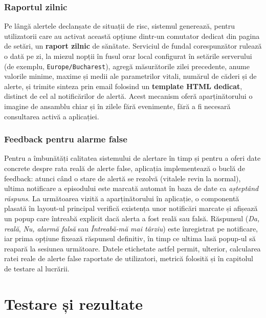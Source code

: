 \documentclass[12pt,a4paper]{article}
\begin{document}
\subsubsection{Raportul zilnic}

Pe lângă alertele declanșate de situații de risc, sistemul generează, pentru utilizatorii care au activat această opțiune dintr-un comutator dedicat din pagina de setări, un \textbf{raport zilnic} de sănătate. Serviciul de fundal corespunzător rulează o dată pe zi, la miezul nopții în fusul orar local configurat în setările serverului (de exemplu, \texttt{Europe/Bucharest}), agregă măsurătorile zilei precedente, anume valorile minime, maxime și medii ale parametrilor vitali, numărul de căderi și de alerte, și trimite sinteza prin email folosind un \textbf{template HTML dedicat}, distinct de cel al notificărilor de alertă. Acest mecanism oferă aparținătorului o imagine de ansamblu chiar și în zilele fără evenimente, fără a fi necesară consultarea activă a aplicației.

\subsubsection{Feedback pentru alarme false}

Pentru a îmbunătăți calitatea sistemului de alertare în timp și pentru a oferi date concrete despre rata reală de alerte false, aplicația implementează o buclă de feedback: atunci când o stare de alertă se rezolvă (vitalele revin la normal), ultima notificare a episodului este marcată automat în baza de date ca \textit{așteptând răspuns}. La următoarea vizită a aparținătorului în aplicație, o componentă plasată în layout-ul principal verifică existența unor notificări marcate și afișează un popup care întreabă explicit dacă alerta a fost reală sau falsă. Răspunsul (\textit{Da, reală}, \textit{Nu, alarmă falsă} sau \textit{Întreabă-mă mai târziu}) este înregistrat pe notificare, iar prima opțiune fixează răspunsul definitiv, în timp ce ultima lasă popup-ul să reapară la sesiunea următoare. Datele etichetate astfel permit, ulterior, calcularea ratei reale de alerte false raportate de utilizatori, metrică folosită și în capitolul de testare al lucrării.


\newpage
\section{Testare și rezultate}
\end{document}

